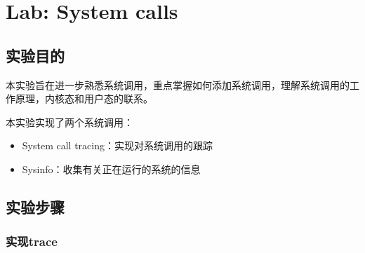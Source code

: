 \section{Lab: System calls}

\subsection{实验目的}

本实验旨在进一步熟悉系统调用，重点掌握如何添加系统调用，理解系统调用的工作原理，内核态和用户态的联系。

本实验实现了两个系统调用：
\begin{itemize}
    \item System call tracing：实现对系统调用的跟踪
    \item Sysinfo：收集有关正在运行的系统的信息
\end{itemize}

\subsection{实验步骤}

\subsubsection{实现trace}

